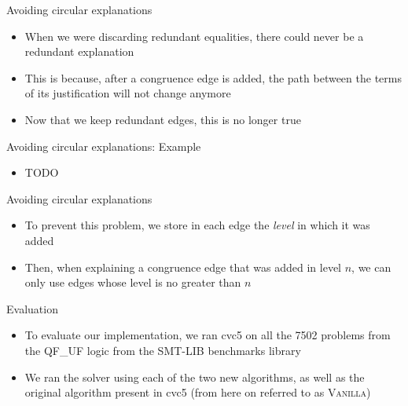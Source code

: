 \documentclass[aspectratio=169]{beamer}
\newcommand\vitem{\vfill\item}
\newcommand\pvitem{\pause\vfill\item}
\begin{document}
\begin{frame}{Avoiding circular explanations}
  \begin{itemize}
    \item When we were discarding redundant equalities, there could never be a
    redundant explanation
    \vitem This is because, after a congruence edge is added, the path between
    the terms of its justification will not change anymore
    \pvitem Now that we keep redundant edges, this is no longer true
  \end{itemize}
\end{frame}

\begin{frame}{Avoiding circular explanations: Example}
  \begin{itemize}
    \item TODO
  \end{itemize}
\end{frame}

\begin{frame}{Avoiding circular explanations}
  \begin{itemize}
    \item To prevent this problem, we store in each edge the \emph{level} in
    which it was added
    \vitem Then, when explaining a congruence edge that was added in level $n$,
    we can only use edges whose level is no greater than $n$
  \end{itemize}
\end{frame}

\begin{frame}{Evaluation}
  \begin{itemize}
    \item To evaluate our implementation, we ran cvc5 on all the 7502 problems
    from the QF\_UF logic from the SMT-LIB benchmarks library
    \vitem We ran the solver using each of the two new algorithms, as well
    as the original algorithm present in cvc5 (from here on referred to as
    \textsc{Vanilla})
  \end{itemize}
\end{frame}
\end{document}
